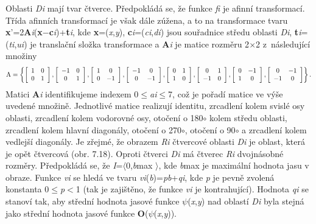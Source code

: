 \noindent Oblasti \textit{Di} mají tvar čtverce. Předpokládá se, že funkce \textit{fi} je afinní transformací. Třída afinních transformací je však dále zúžena, a to na transformace tvaru \textbf{x}'=2\textbf{A}\textit{i}(\textbf{x}$-$\textbf{c}\textit{i})+\textbf{t}\textit{i}, kde \textbf{x}=(\textit{x},\textit{y}), \textbf{c}\textit{i}=(\textit{ci},\textit{di}) jsou souřadnice středu oblasti \textit{Di}, \textbf{t}\textit{i}=(\textit{ti},\textit{ui}) je translační složka transformace a \textbf{A}\textit{i} je matice rozměru 2$\times$2 z~následující množiny
\begin{equation} \label{GrindEQ__7_15_} 
{\rm A}=\left\{\left[\begin{array}{cc} {1} & {0} \\ {0} & {1} \end{array}\right],\left[\begin{array}{cc} {-1} & {0} \\ {0} & {1} \end{array}\right],\left[\begin{array}{cc} {1} & {0} \\ {0} & {-1} \end{array}\right],\left[\begin{array}{cc} {-1} & {0} \\ {0} & {-1} \end{array}\right],\left[\begin{array}{cc} {0} & {1} \\ {1} & {0} \end{array}\right],\left[\begin{array}{cc} {0} & {1} \\ {-1} & {0} \end{array}\right],\left[\begin{array}{cc} {0} & {-1} \\ {1} & {0} \end{array}\right],\left[\begin{array}{cc} {0} & {-1} \\ {-1} & {0} \end{array}\right]\right\}.  
\end{equation} 
Matici \textbf{A}\textit{i} identifikujeme indexem 0$\leq$\textit{ai}$\leq$7, což je pořadí matice ve výše uvedené množině. Jednotlivé matice realizují identitu, zrcadlení kolem svislé osy oblasti, zrcadlení kolem vodorovné osy, otočení o 180$\circ$ kolem středu oblasti, zrcadlení kolem hlavní diagonály, otočení o 270$\circ$, otočení o 90$\circ$ a zrcadlení kolem vedlejší diagonály. Je zřejmé, že obrazem \textit{Ri} čtvercové oblasti \textit{Di} je oblast, která je opět čtvercová (obr. 7.18). Oproti čtverci \textit{Di} má čtverec \textit{Ri} dvojnásobné rozměry. Předpokládá se, že \textit{I}=$\langle$0,\textit{b}max $\rangle$, kde \textit{b}max je maximální hodnota jasu v obraze. Funkce \textit{vi} se hledá ve tvaru \textit{vi}(\textit{b})=\textit{pb}+\textit{qi}, kde \textit{p} je pevně zvolená konstanta 0$\leq$\textit{p$<$}1 (tak je zajištěno, že funkce \textit{vi} je kontrahující). Hodnota \textit{qi} se stanoví tak, aby střední hodnota jasové funkce $\psi$(\textit{x},\textit{y}) nad oblastí \textit{Di} byla stejná jako střední hodnota jasové funkce \textbf{O}($\psi$(\textit{x},\textit{y})).

